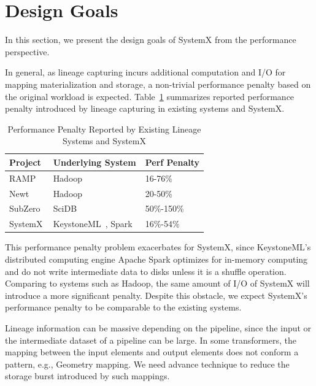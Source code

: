 \documentclass{sig-alternate}
\begin{document}
\section{Design Goals}
\label{sec:Req}
In this section, we present the design goals of SystemX from the performance perspective.

In general, as lineage capturing incurs additional computation and I/O for mapping materialization and storage, a non-trivial performance
penalty based on the original workload is expected. 
Table~\ref{tb:overhead} summarizes reported performance penalty introduced by lineage capturing in existing systems and SystemX. 

\begin{table}[t]
\begin{center}
    \caption{Performance Penalty Reported by Existing Lineage Systems and SystemX}
    \begin{scriptsize}
    \begin{tabular}{ | p{1.5cm} | p{3.5cm} | p{2cm} |}
    \hline
    Project & Underlying System & Perf Penalty  \\ \hline \hline
    RAMP~\cite{ikeda11} & Hadoop~\cite{HADOOP} & 16-76\% \\ \hline
    Newt~\cite{logothetis13} & Hadoop~\cite{HADOOP} & 20-50\% \\ \hline
    SubZero~\cite{wu13} & SciDB~\cite{brown10} & 50\%-150\% \\ \hline
    SystemX & KeystoneML~\cite{sparks15}, Spark~\cite{zaharia12} & 16\%-54\% \\ \hline
    \end{tabular}
    \end{scriptsize}
    \label{tb:overhead}
\end{center}   
\end{table}

This performance penalty problem exacerbates for SystemX, since KeystoneML's distributed computing engine Apache Spark 
optimizes for in-memory computing and do not write intermediate data to disks unless it is a shuffle operation. 
Comparing to systems such as Hadoop, the same amount of I/O of SystemX will introduce a more significant penalty.
Despite this obstacle, we expect SystemX's performance penalty to be comparable to the existing systems.

Lineage information can be massive depending on the pipeline, since the input or the intermediate dataset of a pipeline can be large.
In some transformers, the mapping between the input elements and output elements does not conform a pattern, e.g., Geometry mapping.
We need advance technique to reduce the storage burst introduced by such mappings.
\end{document}
